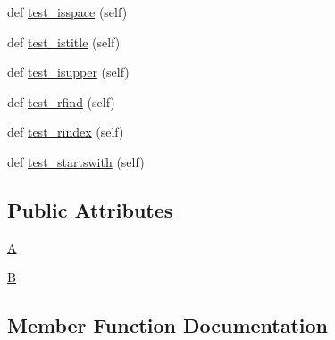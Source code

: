 \begin{DoxyCompactItemize}
\item 
def \hyperlink{classnumpy_1_1core_1_1tests_1_1test__defchararray_1_1TestInformation_a46d5f1ebb14bdaf58a81cee1fcfd7420}{test\+\_\+isspace} (self)
\item 
def \hyperlink{classnumpy_1_1core_1_1tests_1_1test__defchararray_1_1TestInformation_ab44b21fb768e8dbac303fd9f53ef7261}{test\+\_\+istitle} (self)
\item 
def \hyperlink{classnumpy_1_1core_1_1tests_1_1test__defchararray_1_1TestInformation_a58ea4b833dae4bc869c626b71f199a4f}{test\+\_\+isupper} (self)
\item 
def \hyperlink{classnumpy_1_1core_1_1tests_1_1test__defchararray_1_1TestInformation_a7fb4314fe02bad4093d3e93725b8b667}{test\+\_\+rfind} (self)
\item 
def \hyperlink{classnumpy_1_1core_1_1tests_1_1test__defchararray_1_1TestInformation_a323be521fdc72f3ee4d566f247b4bba0}{test\+\_\+rindex} (self)
\item 
def \hyperlink{classnumpy_1_1core_1_1tests_1_1test__defchararray_1_1TestInformation_a7847c03856fc9d200f1b0daeb242ab23}{test\+\_\+startswith} (self)
\end{DoxyCompactItemize}
\subsection*{Public Attributes}
\begin{DoxyCompactItemize}
\item 
\hyperlink{classnumpy_1_1core_1_1tests_1_1test__defchararray_1_1TestInformation_a7a02ba1ec96cab121f75bb435b066be3}{A}
\item 
\hyperlink{classnumpy_1_1core_1_1tests_1_1test__defchararray_1_1TestInformation_a9ba51f2fe3ffea0c1584286d330c419c}{B}
\end{DoxyCompactItemize}


\subsection{Member Function Documentation}
\mbox{\label{classnumpy_1_1core_1_1tests_1_1test__defchararray_1_1TestInformation_a4386fc7dcf32f87ee1b9d93b478984d6}} 
